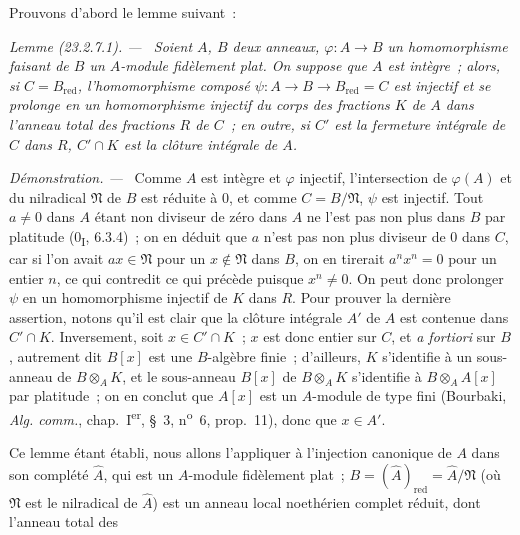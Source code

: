 \documentclass[10pt,oneside]{book}
\makeatletter
\newcommand{\setmanualcurrentlabel}[1]{\def\@currentlabel{#1}}
\newcommand{\oldpage}[2][]{%
  \setcounter{footnote}{0}%
  \marginpar{\scriptsize\textbf{#1}~|~#2}\ignorespaces}
\newenvironment{lemma}[1][]{%
  \setmanualcurrentlabel{#1}\par\medskip\noindent\itshape Lemme (#1). ---\ }{\par}
\newenvironment{proof}{%
  \par\medskip\noindent\textit{Démonstration. ---\ }}{\par}
\makeatother
\begin{document}
Prouvons d'abord le lemme suivant~:

\begin{lemma}[23.2.7.1]
\label{0.23.2.7.1-fr}
Soient $A$, $B$ deux anneaux, $\varphi:A\to B$ un homomorphisme faisant de $B$
un $A$-module fidèlement plat. On suppose que $A$ est intègre~; alors, si
$C=B_{\mathrm{red}}$, l'homomorphisme composé
$\psi:A\to B\to B_{\mathrm{red}}=C$ est injectif et se prolonge en un
homomorphisme injectif du corps des fractions $K$ de $A$ dans l'anneau total
des fractions $R$ de $C$~; en outre, si $C'$ est la fermeture intégrale de
$C$ dans $R$, $C'\cap K$ est la clôture intégrale de $A$.
\end{lemma}

\begin{proof}
Comme $A$ est intègre et $\varphi$ injectif, l'intersection de $\varphi(A)$
et du nilradical $\mathfrak N$ de $B$ est réduite à $0$, et comme
$C=B/\mathfrak N$, $\psi$ est injectif. Tout $a\neq0$ dans $A$ étant non
diviseur de zéro dans $A$ ne l'est pas non plus dans $B$ par platitude
(0\textsubscript{I}, 6.3.4)~; on en déduit que $a$ n'est pas non plus diviseur
de $0$ dans $C$, car si l'on avait $ax\in\mathfrak N$ pour un
$x\notin\mathfrak N$ dans $B$, on en tirerait $a^nx^n=0$ pour un entier $n$,
ce qui contredit ce qui précède puisque $x^n\neq0$. On peut donc prolonger
$\psi$ en un homomorphisme injectif de $K$ dans $R$. Pour prouver la dernière
assertion, notons qu'il est clair que la clôture intégrale $A'$ de $A$ est
contenue dans $C'\cap K$. Inversement, soit $x\in C'\cap K$~; $x$ est donc
entier sur $C$, et \emph{a fortiori} sur $B$, autrement dit $B[x]$ est une
$B$-algèbre finie~; d'ailleurs, $K$ s'identifie à un sous-anneau de
$B\otimes_AK$, et le sous-anneau $B[x]$ de $B\otimes_AK$ s'identifie à
$B\otimes_AA[x]$ par platitude~; on en conclut que $A[x]$ est un $A$-module
de type fini (Bourbaki, \emph{Alg. comm.}, chap.~I\textsuperscript{er}, §~3,
n\textsuperscript{o}~6, prop.~11), donc que $x\in A'$.
\end{proof}

Ce lemme étant établi, nous allons l'appliquer à l'injection canonique de $A$
dans son complété $\widehat A$, qui est un $A$-module fidèlement plat~;
$B=(\widehat A)_{\mathrm{red}}=\widehat A/\mathfrak N$ (où $\mathfrak N$ est
le nilradical de $\widehat A$) est un anneau local noethérien complet réduit,
dont l'anneau total des

\oldpage[0\textsubscript{IV-1}]{220}
\end{document}
